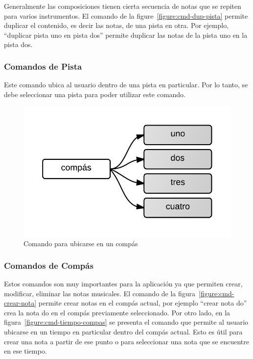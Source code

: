 Generalmente las composiciones tienen cierta secuencia de notas que se repiten para varios instrumentos. El comando de la 
figure~\ref{figure:cmd-dup-pista} permite duplicar el contenido, es decir las notas, de una pista en otra. Por ejemplo, 
``duplicar pista uno en pista dos'' permite duplicar las notas de la pista uno en la pista dos.

\subsubsection{Comandos de Pista} 

Este comando ubica al usuario dentro de una pista en particular. Por lo tanto, se debe
seleccionar una pista para poder utilizar este comando.

\begin{figure}[H] 
\centering
\includegraphics[width=0.4\linewidth]{./graphics/cmd-compas.png}
\caption{Comando para ubicarse en un comp\'as}
\label{figure:cmd-compas}
\quad
\end{figure}

\subsubsection{Comandos de Comp\'as}

Estos comandos son muy importantes para la aplicaci\'on ya que permiten crear, modificar, 
eliminar las notas musicales. El comando de la figura~\ref{figure:cmd-crear-nota} permite crear notas en el  
comp\'as actual, por ejemplo ``crear nota do'' crea la nota do en el comp\'as previamente seleccionado. Por otro lado, en la figura~\ref{figure:cmd-tiempo-compas} se presenta el comando que permite al usuario ubicarse en un  
tiempo en particular dentro del comp\'as actual. Esto es \'util para crear una nota a partir de ese punto o 
para seleccionar una nota que se encuentre en ese tiempo.

